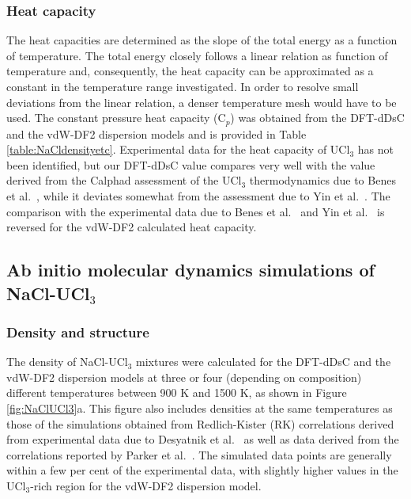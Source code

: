 \documentclass[preprint,3p,10pt,onecolumn,number,sort&compress]{elsarticle}
\begin{document}
\subsubsection{Heat capacity} 
The heat capacities are determined as the slope of the total energy as a function of temperature. The total energy closely follows a linear relation as function of temperature and, consequently, the heat capacity can be approximated as a constant in the temperature range investigated. In order to resolve small deviations from the linear relation, a denser temperature mesh would have to be used. The constant pressure heat capacity (C$_p$) was obtained from the DFT-dDsC and the vdW-DF2 dispersion models and is provided in Table \ref{table:NaCldensityetc}. Experimental data for the heat capacity of UCl$_3$ has not been identified, but our DFT-dDsC value compares very well with the value derived from the Calphad assessment of the UCl$_3$ thermodynamics due to Benes et al.~\cite{BENES2008}, while it deviates somewhat from the assessment due to Yin et al.~\cite{YIN2020}. The comparison with the experimental data due to Benes et al.~\cite{BENES2008}  and Yin et al.~\cite{YIN2020} is reversed for the vdW-DF2 calculated heat capacity. 

\FloatBarrier

\subsection{Ab initio molecular dynamics simulations of NaCl-UCl$_3$}
\subsubsection{Density and structure}
The density of NaCl-UCl$_3$ mixtures were calculated for the DFT-dDsC and the vdW-DF2 dispersion models at three or four (depending on composition) different temperatures between 900 K and 1500 K, as shown in Figure \ref{fig:NaClUCl3}a. This figure also includes densities at the same temperatures as those of the simulations obtained from Redlich-Kister (RK) correlations \cite{agca2022} derived from experimental data due to Desyatnik et al.~\cite{Desyatnik} as well as data derived from the correlations reported by Parker et al.~\cite{Parker}. The simulated data points are generally within a few per cent of the experimental data, with slightly higher values in the UCl$_3$-rich region for the vdW-DF2 dispersion model.
\end{document}
